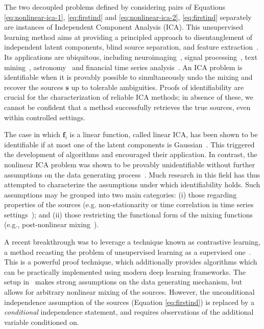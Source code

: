 \documentclass[letterpaper]{article}
\theoremstyle{definition}
\begin{document}
The two decoupled problems defined by considering pairs of Equations \ref{eq:nonlinear-ica-1}, \ref{eq:firstind} and \ref{eq:nonlinear-ica-2}, \ref{eq:firstind} separately are instances of Independent Component Analysis (ICA). This unsupervised learning method aims at providing a principled approach to disentanglement of independent latent components, blind source separation, and feature extraction~\cite{hyvarinen2000independent}. Its applications are ubiquitous, including neuroimaging~\cite{mckeown1998independent}, signal processing~\cite{sawada2003direction}, text mining~\cite{honkela2010wordica}, astronomy~\cite{nuzillard2000blind} and financial time series analysis~\cite{oja2000independent}.
An ICA problem is identifiable when it is provably possible to simultaneously undo the mixing and recover the sources $\bm{s}$
up to tolerable ambiguities.
Proofs of identifiability are crucial for the characterization of reliable ICA methods; in absence of these, we cannot be confident that a method successfully retrieves the true sources, even within controlled settings.

The case in which $\bm{f}_i$ is a linear function, called linear ICA, has been shown to be identifiable if at most one of the latent components is Gaussian~\cite{darmois1953analyse, skitovich1954linear, comon1994independent}.
This triggered the development of algorithms and encouraged their application. In contrast, the nonlinear ICA problem was shown to be provably unidentifiable without further assumptions on the data generating process~\cite{hyvarinen1999nonlinear}.
Much research in this field has thus attempted to characterize the assumptions under which identifiability holds.
Such assumptions may be grouped into two main categories: (i) those regarding properties of the sources (e.g. non-stationarity or time correlation in time series settings~\cite{cardoso2001three, singer2008non}); and (ii) those restricting the functional form of the mixing functions (e.g., post-nonlinear mixing~\cite{taleb1999source}).

A recent breakthrough was to leverage a technique known as contrastive learning, a method recasting the problem of unsupervised learning as a supervised one~\cite{gutmann2010noise,hyvarinen2016unsupervised, pmlr-v54-hyvarinen17a, hyvarinen19a}. This is a powerful proof technique, which additionally provides algorithms which can be practically implemented using modern deep learning frameworks.
The setup in~\cite{hyvarinen2016unsupervised, pmlr-v54-hyvarinen17a, hyvarinen19a} makes strong assumptions on the data generating mechanism, but allows for arbitrary nonlinear mixing of the sources. However, the
unconditional
independence assumption of the sources (Equation \ref{eq:firstind}) is replaced by a {\em conditional} independence statement, and requires observations of the additional variable conditioned on.
\end{document}

